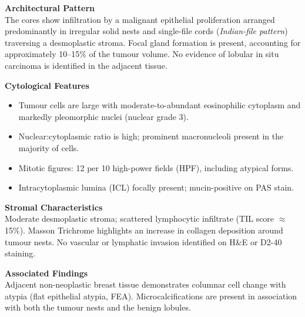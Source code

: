 \documentclass[11pt,a4paper]{article}
\begin{document}
\begin{tcolorbox}[sectionbox, title={\faMicroscope\quad Microscopic Findings}]

\textbf{\color{PathBlue}Architectural Pattern}\\[2pt]
The cores show infiltration by a malignant epithelial proliferation arranged predominantly in
irregular solid nests and single-file cords (\emph{Indian-file pattern}) traversing a desmoplastic
stroma. Focal gland formation is present, accounting for approximately 10--15\% of the tumour
volume. No evidence of lobular in situ carcinoma is identified in the adjacent tissue.

\vspace{6pt}
\textbf{\color{PathBlue}Cytological Features}

\begin{itemize}[leftmargin=1.6em, itemsep=2pt, topsep=2pt]
  \item Tumour cells are large with moderate-to-abundant eosinophilic cytoplasm and
        markedly pleomorphic nuclei (nuclear grade 3).
  \item Nuclear:cytoplasmic ratio is high; prominent macronucleoli present in the majority
        of cells.
  \item Mitotic figures: 12 per 10 high-power fields (HPF), including atypical forms.
  \item Intracytoplasmic lumina (ICL) focally present; mucin-positive on PAS stain.
\end{itemize}

\vspace{6pt}
\textbf{\color{PathBlue}Stromal Characteristics}\\[2pt]
Moderate desmoplastic stroma; scattered lymphocytic infiltrate (TIL score $\approx$ 15\%).
Masson Trichrome highlights an increase in collagen deposition around tumour nests.
No vascular or lymphatic invasion identified on H\&{}E or D2-40 staining.

\vspace{6pt}
\textbf{\color{PathBlue}Associated Findings}\\[2pt]
Adjacent non-neoplastic breast tissue demonstrates columnar cell change with atypia (flat
epithelial atypia, FEA). Microcalcifications are present in association with both the
tumour nests and the benign lobules.

\end{tcolorbox}

\vspace{4pt}
\end{document}
